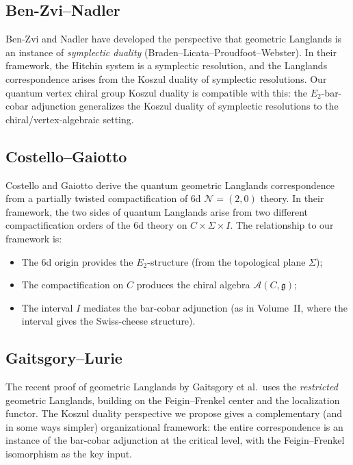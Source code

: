\documentclass[11pt]{article}
\theoremstyle{definition}
\theoremstyle{remark}
\newcommand{\g}{\mathfrak{g}}
\begin{document}
\subsection{Ben-Zvi--Nadler}
Ben-Zvi and Nadler have developed the perspective that geometric Langlands is
an instance of \emph{symplectic duality} (Braden--Licata--Proudfoot--Webster).
In their framework, the Hitchin system is a symplectic resolution, and the
Langlands correspondence arises from the Koszul duality of symplectic
resolutions. Our quantum vertex chiral group Koszul duality is compatible
with this: the $E_2$-bar-cobar adjunction generalizes the Koszul duality of
symplectic resolutions to the chiral/vertex-algebraic setting.

\subsection{Costello--Gaiotto}
Costello and Gaiotto derive the quantum geometric Langlands correspondence from
a partially twisted compactification of 6d $\mathcal{N}=(2,0)$ theory. In
their framework, the two sides of quantum Langlands arise from two different
compactification orders of the 6d theory on $C \times \Sigma \times I$. The
relationship to our framework is:
\begin{itemize}
 \item The 6d origin provides the $E_2$-structure (from the topological plane
 $\Sigma$);
 \item The compactification on $C$ produces the chiral algebra
 $\mathcal{A}(C, \g)$;
 \item The interval $I$ mediates the bar-cobar adjunction (as in Volume~II,
 where the interval gives the Swiss-cheese structure).
\end{itemize}

\subsection{Gaitsgory--Lurie}
The recent proof of geometric Langlands by Gaitsgory et al.\ uses the
\emph{restricted} geometric Langlands, building on the Feigin--Frenkel center
and the localization functor. The Koszul duality perspective we propose
gives a complementary (and in some ways simpler) organizational framework:
the entire correspondence is an instance of the bar-cobar adjunction at the
critical level, with the Feigin--Frenkel isomorphism as the key input.


\end{document}
